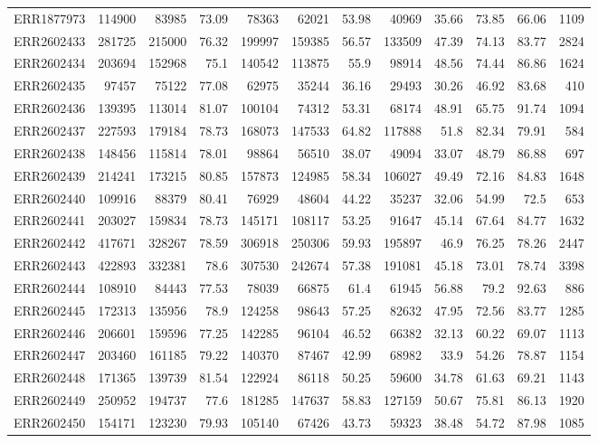 \documentclass[12pt, oneside]{report}
\begin{document}
\begin{longtable}{@{}p{3.2cm}rrrrrrrrrrr@{}}
ERR1877973 & 114900 & 83985 & 73.09 & 78363 & 62021 & 53.98 & 40969 & 35.66 & 73.85 & 66.06 & 1109 \\
ERR2602433 & 281725 & 215000 & 76.32 & 199997 & 159385 & 56.57 & 133509 & 47.39 & 74.13 & 83.77 & 2824 \\
ERR2602434 & 203694 & 152968 & 75.1 & 140542 & 113875 & 55.9 & 98914 & 48.56 & 74.44 & 86.86 & 1624 \\
ERR2602435 & 97457 & 75122 & 77.08 & 62975 & 35244 & 36.16 & 29493 & 30.26 & 46.92 & 83.68 & 410 \\
ERR2602436 & 139395 & 113014 & 81.07 & 100104 & 74312 & 53.31 & 68174 & 48.91 & 65.75 & 91.74 & 1094 \\
ERR2602437 & 227593 & 179184 & 78.73 & 168073 & 147533 & 64.82 & 117888 & 51.8 & 82.34 & 79.91 & 584 \\
ERR2602438 & 148456 & 115814 & 78.01 & 98864 & 56510 & 38.07 & 49094 & 33.07 & 48.79 & 86.88 & 697 \\
ERR2602439 & 214241 & 173215 & 80.85 & 157873 & 124985 & 58.34 & 106027 & 49.49 & 72.16 & 84.83 & 1648 \\
ERR2602440 & 109916 & 88379 & 80.41 & 76929 & 48604 & 44.22 & 35237 & 32.06 & 54.99 & 72.5 & 653 \\
ERR2602441 & 203027 & 159834 & 78.73 & 145171 & 108117 & 53.25 & 91647 & 45.14 & 67.64 & 84.77 & 1632 \\
ERR2602442 & 417671 & 328267 & 78.59 & 306918 & 250306 & 59.93 & 195897 & 46.9 & 76.25 & 78.26 & 2447 \\
ERR2602443 & 422893 & 332381 & 78.6 & 307530 & 242674 & 57.38 & 191081 & 45.18 & 73.01 & 78.74 & 3398 \\
ERR2602444 & 108910 & 84443 & 77.53 & 78039 & 66875 & 61.4 & 61945 & 56.88 & 79.2 & 92.63 & 886 \\
ERR2602445 & 172313 & 135956 & 78.9 & 124258 & 98643 & 57.25 & 82632 & 47.95 & 72.56 & 83.77 & 1285 \\
ERR2602446 & 206601 & 159596 & 77.25 & 142285 & 96104 & 46.52 & 66382 & 32.13 & 60.22 & 69.07 & 1113 \\
ERR2602447 & 203460 & 161185 & 79.22 & 140370 & 87467 & 42.99 & 68982 & 33.9 & 54.26 & 78.87 & 1154 \\
ERR2602448 & 171365 & 139739 & 81.54 & 122924 & 86118 & 50.25 & 59600 & 34.78 & 61.63 & 69.21 & 1143 \\
ERR2602449 & 250952 & 194737 & 77.6 & 181285 & 147637 & 58.83 & 127159 & 50.67 & 75.81 & 86.13 & 1920 \\
ERR2602450 & 154171 & 123230 & 79.93 & 105140 & 67426 & 43.73 & 59323 & 38.48 & 54.72 & 87.98 & 1085 \\

\end{longtable}
\end{document}
